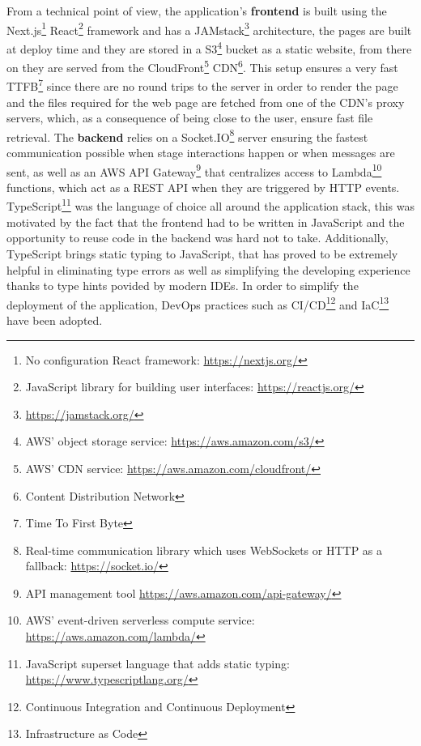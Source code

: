 From a technical point of view, the application's \textbf{frontend} is built using the Next.js\footnote{No configuration React framework: \href{https://nextjs.org/}{https://nextjs.org/}} React\footnote{JavaScript library for building user interfaces: \href{https://reactjs.org/}{https://reactjs.org/}} framework and has a JAMstack\footnote{\href{https://jamstack.org/}{https://jamstack.org/}} architecture, the pages are built at deploy time and they are stored in a S3\footnote{AWS' object storage service: \href{https://aws.amazon.com/s3/}{https://aws.amazon.com/s3/}} bucket as a static website, from there on they are served from the CloudFront\footnote{AWS' CDN service: \href{https://aws.amazon.com/cloudfront/}{https://aws.amazon.com/cloudfront/}} CDN\footnote{Content Distribution Network}. This setup ensures a very fast TTFB\footnote{Time To First Byte} since there are no round trips to the server in order to render the page and the files required for the web page are fetched from one of the CDN's proxy servers, which, as a consequence of being close to the user, ensure fast file retrieval. The \textbf{backend} relies on a Socket.IO\footnote{Real-time communication library which uses WebSockets or HTTP as a fallback: \href{https://socket.io/}{https://socket.io/}} server ensuring the fastest communication possible when stage interactions happen or when messages are sent, as well as an AWS API Gateway\footnote{API management tool \href{https://aws.amazon.com/api-gateway/}{https://aws.amazon.com/api-gateway/}} that centralizes access to Lambda\footnote{AWS' event-driven serverless compute service: \href{https://aws.amazon.com/lambda/}{https://aws.amazon.com/lambda/}} functions, which act as a REST API when they are triggered by HTTP events. TypeScript\footnote{JavaScript superset language that adds static typing: \href{https://www.typescriptlang.org/}{https://www.typescriptlang.org/}} was the language of choice all around the application stack, this was motivated by the fact that the frontend had to be written in JavaScript and the opportunity to reuse code in the backend was hard not to take. Additionally, TypeScript brings static typing to JavaScript, that has proved to be extremely helpful in eliminating type errors as well as simplifying the developing experience thanks to type hints povided by modern IDEs. In order to simplify the deployment of the application, DevOps practices such as CI/CD\footnote{Continuous Integration and Continuous Deployment} and IaC\footnote{Infrastructure as Code} have been adopted.


